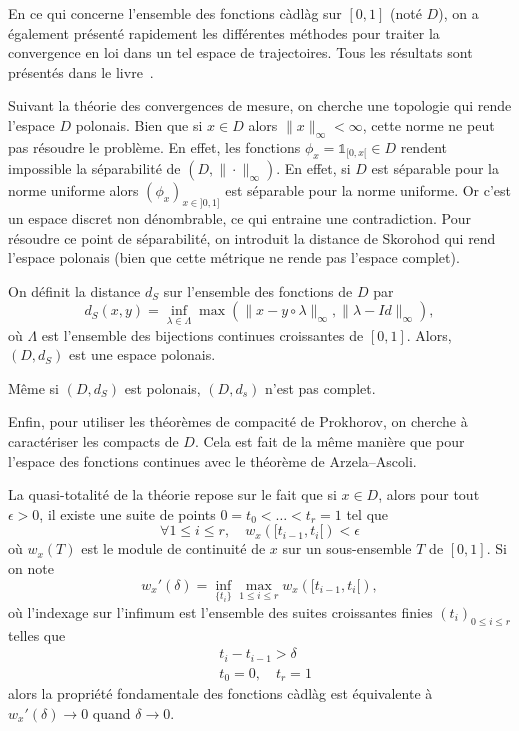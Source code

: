En ce qui concerne l'ensemble des fonctions càdlàg sur $[0,1]$ (noté $D$), on a également présenté rapidement les différentes méthodes pour traiter la convergence en loi dans un tel espace de trajectoires. Tous les résultats sont présentés dans le livre~\cite{Billingsley}.

\begin{important}
	Suivant la théorie des convergences de mesure, on cherche une topologie qui rende l'espace $D$ polonais. Bien que si $x \in D$ alors $\|x\|_\infty < \infty$, cette norme ne peut pas résoudre le problème. En effet, les fonctions $\phi_x = \mathbb{1}_{[0,x[} \in D$ rendent impossible la séparabilité de $(D, \|\cdot\|_\infty)$. En effet, si $D$ est séparable pour la norme uniforme alors $(\phi_x)_{x \in ]0,1]}$ est séparable pour la norme uniforme. Or c'est un espace discret non dénombrable, ce qui entraine une contradiction.
	Pour résoudre ce point de séparabilité, on introduit la distance de Skorohod qui rend l'espace polonais (bien que cette métrique ne rende pas l'espace complet).
\end{important}

\begin{prop}{}{}
	On définit la distance $d_S$ sur l'ensemble des fonctions de $D$ par
	\[
		d_S (x,y) = \inf_{\lambda \in \Lambda} \max(\|x - y \circ\lambda\|_\infty,
		\|\lambda - Id\|_\infty),
	\]
	où $\Lambda$ est l'ensemble des bijections continues croissantes de $[0,1]$. Alors, $(D,d_S)$ est une espace polonais.
\end{prop}

\begin{rem}
	Même si $(D, d_S)$ est polonais, $(D,d_s)$ n'est pas complet.
\end{rem}

Enfin, pour utiliser les théorèmes de compacité de Prokhorov, on cherche à caractériser les compacts de $D$. Cela est fait de la même manière que pour l'espace des fonctions continues avec le théorème de Arzela--Ascoli.

\begin{important}
	La quasi-totalité de la théorie repose sur le fait que si $x \in D$, alors pour tout $\epsilon > 0$, il existe une suite de points $0 = t_0 < \dots < t_r=1$ tel que
	\[
		\forall 1 \le i \le r, \quad w_x([t_{i-1}, t_i[) < \epsilon
	\]
	où $w_x(T)$ est le module de continuité de $x$ sur un sous-ensemble $T$ de $[0,1]$. Si on note
	\[
		w_x'(\delta) = \inf_{\{t_i\}} \max_{1\le i\le r} w_x([t_{i-1}, t_i[),
	\]
	où l'indexage sur l'infimum est l'ensemble des suites croissantes finies $(t_i)_{0\le i \le r}$ telles que
	\begin{align*}
		 & t_i - t_{i-1} > \delta \\
		 & t_0= 0, \quad t_r = 1
	\end{align*}
	alors la propriété fondamentale des fonctions càdlàg est équivalente à $w_x'(\delta) \to 0$ quand $\delta \to 0$.
\end{important}

